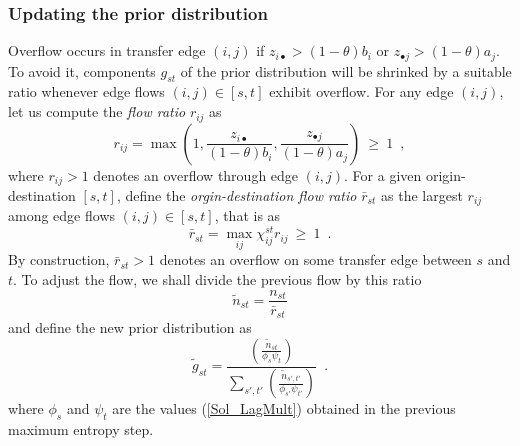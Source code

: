 \documentclass{bmcart}
\begin{document}
\subsubsection{Updating the prior distribution}
\label{priorup}
Overflow occurs in transfer edge $(i, j)$ if  $z_{i \bullet} > (1 - \theta)b_i$ or $z_{\bullet j} > (1 - \theta)a_j$. To avoid it, components $g_{st}$ of the prior distribution will be shrinked by a suitable ratio whenever edge flows $(i,j)\in [s,t]$ exhibit overflow. 
For any edge $(i, j)$, let us compute the \emph{flow ratio} $r_{ij}$ as
\begin{equation}
	r_{ij} = \max \left(1, \frac{z_{i \bullet}}{(1 - \theta)b_i}, \frac{z_{\bullet j}}{(1 - \theta)a_j} \right)\: \ge\: 1\enspace, \label{flow_ratio}
\end{equation}
where $r_{ij} > 1$ denotes an overflow through edge $(i, j)$. For a given origin-destination $[s,t]$, define the \emph{orgin-destination flow ratio} $\bar{r}_{st}$ 
as the largest $r_{ij}$ among edge flows $(i,j)\in [s,t]$, that is as 
\begin{equation}
	\label{st_flow_ratio}
	\bar{r}_{st} = \max_{ij} \chi_{ij}^{st} r_{ij}\: \ge\: 1\enspace.
\end{equation}
By construction, $\bar{r}_{st} > 1$ denotes an overflow on some transfer edge between $s$ and $t$. To adjust the flow, we shall divide the previous flow by this ratio
\begin{equation}
	\label{update_flow}
	\widetilde{n}_{st} =\frac{n_{st}}{\bar{r}_{st}}
\end{equation}
and define the new prior distribution as
\begin{equation}
	\label{update_distrib}
	\widetilde{g}_{st} = \frac{\left( \frac{\widetilde{n}_{st}}{\phi_s \psi_t} \right)}{\sum_{s',t'} \left( \frac{\widetilde{n}_{s',t'}}{\phi_{s'} \psi_{t'}} \right)}\enspace. 
\end{equation}
where $\phi_s$ and $\psi_t$ are the values (\ref{Sol_LagMult}) obtained in the previous maximum entropy step. 
\end{document}
